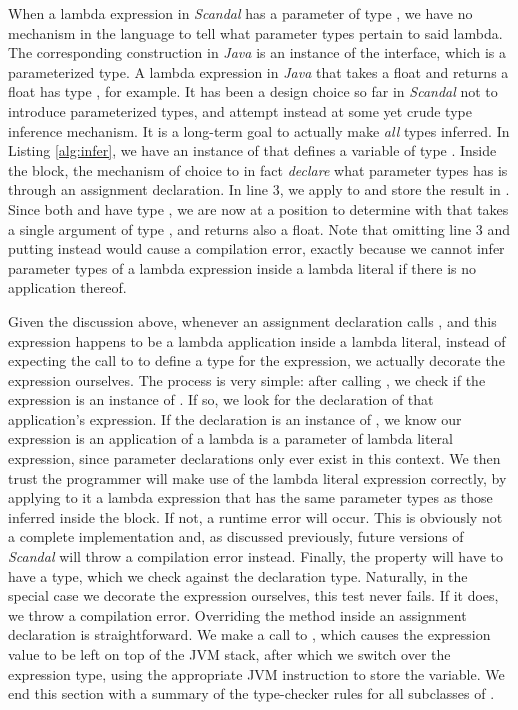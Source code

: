 When a lambda expression in \emph{Scandal} has a parameter of type , we have no mechanism in the language to tell what parameter types pertain to said lambda. The corresponding construction in \emph{Java} is an instance of the  interface, which is a parameterized type. A lambda expression in \emph{Java} that takes a float and returns a float has type , for example. It has been a design choice so far in \emph{Scandal} not to introduce parameterized types, and attempt instead at some yet crude type inference mechanism. It is a long-term goal to actually make \emph{all} types inferred. In Listing \ref{alg:infer}, we have an instance of  that defines a variable  of type . Inside the block, the mechanism of choice to in fact \emph{declare} what parameter types  has is through an assignment declaration. In line 3, we apply  to  and store the result in . Since both  and  have type , we are now at a position to determine with that  takes a single argument of type , and returns also a float. Note that omitting line 3 and putting  instead would cause a compilation error, exactly because we cannot infer parameter types of a lambda expression inside a lambda literal if there is no application thereof.

Given the discussion above, whenever an assignment declaration calls , and this expression happens to be a lambda application inside a lambda literal, instead of expecting the call to  to define a type for the expression, we actually decorate the expression ourselves. The process is very simple: after calling , we check if the expression is an instance of . If so, we look for the declaration of that application's expression. If the declaration is an instance of , we know our expression is an application of a lambda is a parameter of lambda literal expression, since parameter declarations only ever exist in this context. We then trust the programmer will make use of the lambda literal expression correctly, by applying to it a lambda expression that has the same parameter types as those inferred inside the block. If not, a runtime error will occur. This is obviously not a complete implementation and, as discussed previously, future versions of \emph{Scandal} will throw a compilation error instead. Finally, the  property will have to have a type, which we check against the declaration type. Naturally, in the special case we decorate the expression ourselves, this test never fails. If it does, we throw a compilation error. Overriding the  method inside an assignment declaration is straightforward. We make a call to , which causes the expression value to be left on top of the JVM stack, after which we switch over the expression type, using the appropriate JVM instruction to store the variable. We end this section with a summary of the type-checker rules for all subclasses of .

